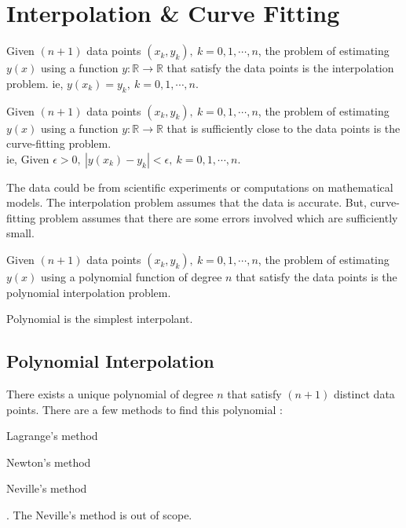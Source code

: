 \chapter{Interpolation \& Curve Fitting}
\begin{definition}
	Given $(n+1)$ data points $(x_k, y_k),\ k = 0,1,\cdots,n$, the problem of estimating $y(x)$ using a function $y : \mathbb{R} \to \mathbb{R}$ that satisfy the data points is the interpolation problem. ie, $y(x_k) = y_k,\ k = 0,1,\cdots,n$.
\end{definition}
\begin{definition}
	Given $(n+1)$ data points $(x_k,y_k),\ k = 0,1,\cdots,n$, the problem of estimating $y(x)$ using a function $y : \mathbb{R} \to \mathbb{R}$ that is sufficiently close to the data points is the curve-fitting problem.\\ ie, Given $\epsilon > 0,\ |y(x_k)-y_k| < \epsilon,\ k = 0,1,\cdots,n$.
\end{definition}
\begin{remark}
	The data could be from scientific experiments or computations on mathematical models. The interpolation problem assumes that the data is accurate. But, curve-fitting problem assumes that there are some errors involved which are sufficiently small.
\end{remark}
\begin{definition}
	Given $(n+1)$ data points $(x_k,y_k),\ k = 0,1,\cdots,n$, the problem of estimating $y(x)$ using a polynomial function of degree $n$ that satisfy the data points is the polynomial interpolation problem.
\end{definition}
\begin{remark}
	Polynomial is the simplest interpolant.\cite[3.2]{kiusalaas}
\end{remark}

\section{Polynomial Interpolation}
There exists a unique polynomial of degree $n$ that satisfy $(n+1)$ distinct data points. There are a few methods to find this polynomial : 
\begin{enumerate*}
	\item Lagrange's method
	\item Newton's method
	\item Neville's method
\end{enumerate*}. The Neville's method is out of scope.

